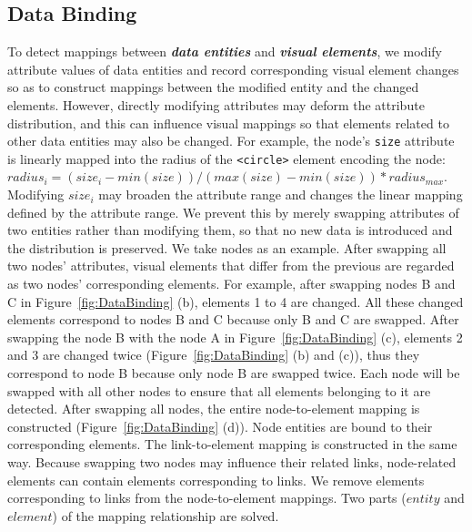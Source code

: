 \subsection{Data Binding} \label{sec:databinding}
To detect mappings between \textbf{\textit{data entities}} and \textbf{\textit{visual elements}}, 
we modify attribute values of data entities and record corresponding visual element changes so as to construct mappings between the modified entity and the changed elements.
However, directly modifying attributes may deform the attribute distribution, and this can influence visual mappings so that elements related to other data entities may also be changed.
For example, the node's \texttt{size} attribute is linearly mapped into the radius of the \texttt{<circle>} element encoding the node: 
$radius_i = (size_i - min(size)) / (max(size) - min(size)) * radius_{max}$.
Modifying $size_i$ may broaden the attribute range and changes the linear mapping defined by the attribute range.
We prevent this by merely swapping attributes of two entities rather than modifying them, so that no new data is introduced and the distribution is preserved.
We take nodes as an example.
After swapping all two nodes' attributes, visual elements that differ from the previous are regarded as two nodes' corresponding elements.
For example, after swapping nodes B and C in Figure~\ref{fig:DataBinding} (b), elements 1 to 4 are changed.
All these changed elements correspond to nodes B and C because only B and C are swapped.
After swapping the node B with the node A in Figure~\ref{fig:DataBinding} (c), elements 2 and 3 are changed twice (Figure~\ref{fig:DataBinding} (b) and (c)), thus they correspond to node B because only node B are swapped twice.
Each node will be swapped with all other nodes to ensure that all elements belonging to it are detected.
After swapping all nodes, the entire node-to-element mapping is constructed (Figure~\ref{fig:DataBinding} (d)).
Node entities are bound to their corresponding elements.
The link-to-element mapping is constructed in the same way.
Because swapping two nodes may influence their related links, node-related elements can contain elements corresponding to links.
We remove elements corresponding to links from the node-to-element mappings.
Two parts ($entity$ and $element$) of the mapping relationship are solved.

